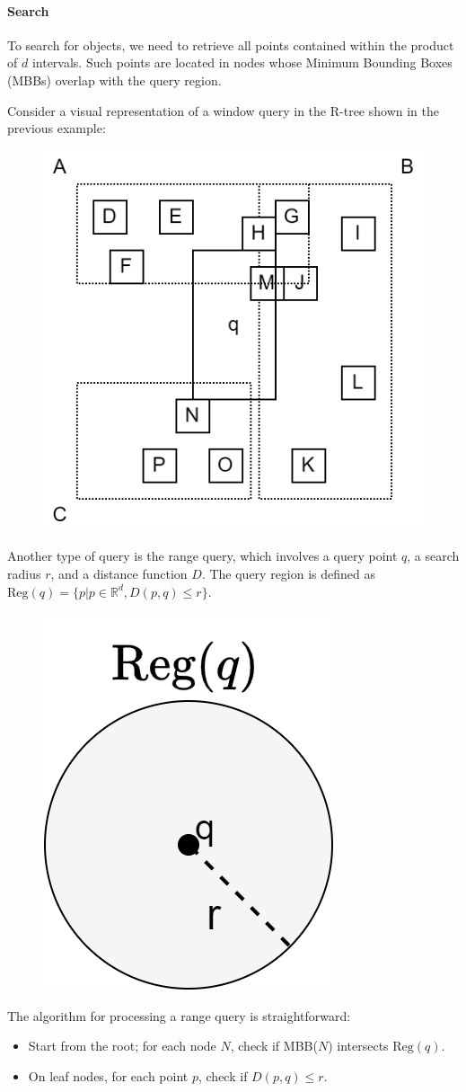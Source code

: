 \paragraph*{Search}
To search for objects, we need to retrieve all points contained within the product of $d$ intervals. 
Such points are located in nodes whose Minimum Bounding Boxes (MBBs) overlap with the query region.
\begin{example}
    Consider a visual representation of a window query in the R-tree shown in the previous example:
    \begin{figure}[H]
        \centering
        \includegraphics[width=0.4\linewidth]{images/r3.png}
    \end{figure}
\end{example}
Another type of query is the range query, which involves a query point $q$, a search radius $r$, and a distance function $D$.
The query region is defined as $\text{Reg}(q)=\{p|p \in \mathbb{R}^d, D(p,q) \leq r\}$. 
\begin{figure}[H]
    \centering
    \includegraphics[width=0.15\linewidth]{images/r4.png}
\end{figure}
The algorithm for processing a range query is straightforward:
\begin{itemize}
    \item Start from the root; for each node $N$, check if MBB($N$) intersects $\text{Reg}(q)$. 
    \item On leaf nodes, for each point $p$, check if $D(p,q) \leq r$. 
\end{itemize}

